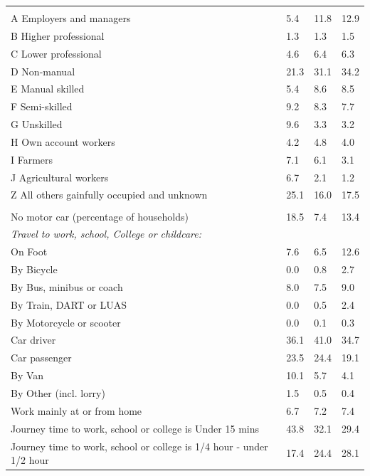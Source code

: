 \documentclass{article}
\begin{document}
\begin{table}[h]
\begin{tabular}{KTTT}
\hline
    \\ 
    \hline
A Employers and managers &  5.4& 11.8& 12.9\\
B Higher professional & 1.3& 1.3& 1.5\\
C Lower professional & 4.6& 6.4& 6.3\\
D Non-manual & 21.3& 31.1& 34.2\\
E Manual skilled & 5.4& 8.6& 8.5\\
F Semi-skilled & 9.2& 8.3& 7.7\\
G Unskilled & 9.6& 3.3& 3.2\\
H Own account workers & 4.2& 4.8& 4.0\\
I Farmers & 7.1& 6.1& 3.1\\
J Agricultural workers & 6.7& 2.1& 1.2\\
Z All others gainfully occupied and unknown & 25.1& 16.0& 17.5\\
\hline
{}\hline
    \\ 
    \hline
No motor car (percentage of households) & 18.5&  7.4& 
13.4\\
    \hline
\emph{Travel to work, school, College or childcare:} & & & \\
\quad On Foot &  7.6&  6.5& 12.6\\
\quad By Bicycle & 0.0& 0.8& 2.7\\
\quad By Bus, minibus or coach & 8.0& 7.5& 9.0\\
\quad By Train, DART or LUAS & 0.0& 0.5& 2.4\\
\quad By Motorcycle or scooter & 0.0& 0.1& 0.3\\
\quad Car driver & 36.1& 41.0& 34.7\\
\quad Car passenger & 23.5& 24.4& 19.1\\
\quad By Van & 10.1&  5.7&  4.1\\
\quad By Other (incl. lorry) & 1.5& 0.5& 0.4\\
    \hline
Work mainly at or from home & 6.7& 7.2& 7.4\\
Journey time to work, school or college is Under 15 mins & 43.8& 32.1& 29.4\\
Journey time to work, school or college is 1/4 hour - under 1/2 hour & 17.4& 24.4& 28.1\\

\end{tabular}
\end{table}
\end{document}
